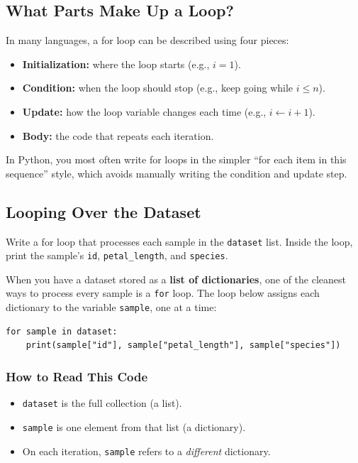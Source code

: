 \subsection{What Parts Make Up a Loop?}
In many languages, a for loop can be described using four pieces:
\begin{itemize}
  \item \textbf{Initialization:} where the loop starts (e.g., $i=1$).
  \item \textbf{Condition:} when the loop should stop (e.g., keep going while $i \le n$).
  \item \textbf{Update:} how the loop variable changes each time (e.g., $i \leftarrow i+1$).
  \item \textbf{Body:} the code that repeats each iteration.
\end{itemize}

\noindent
In Python, you most often write for loops in the simpler ``for each item in this sequence'' style, which avoids manually writing the condition and update step.

\subsection{Looping Over the Dataset}
\label{sec:ses3_loop}


\begin{tcolorbox}[title=Task 3: Create a for loop to process the dataset]
Write a for loop that processes each sample in the \texttt{dataset} list. Inside the loop, print the sample's \texttt{id}, \texttt{petal\_length}, and \texttt{species}.
\end{tcolorbox}

When you have a dataset stored as a \textbf{list of dictionaries}, one of the cleanest ways to process every sample is a \texttt{for} loop. The loop below assigns each dictionary to the variable \texttt{sample}, one at a time:

\begin{verbatim}
for sample in dataset:
    print(sample["id"], sample["petal_length"], sample["species"])
\end{verbatim}

\subsubsection{How to Read This Code}
\begin{itemize}
  \item \texttt{dataset} is the full collection (a list).
  \item \texttt{sample} is one element from that list (a dictionary).
  \item On each iteration, \texttt{sample} refers to a \emph{different} dictionary.
\end{itemize}

